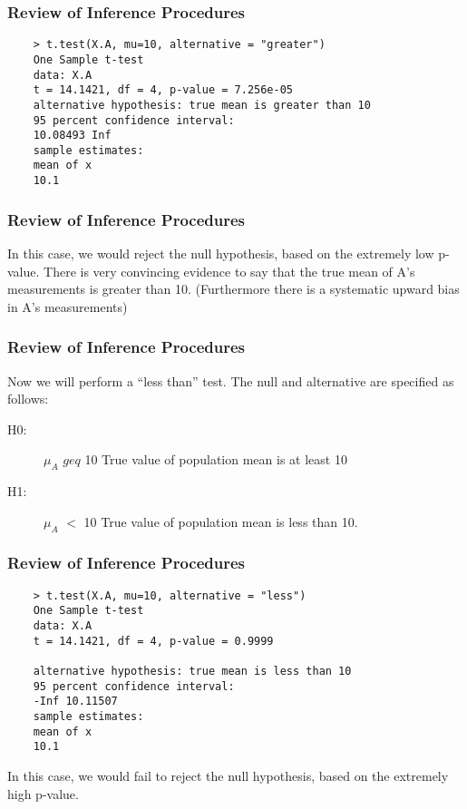 \documentclass{beamer}
\begin{document}
\begin{frame}[fragile]
	\frametitle{Review of Inference Procedures}
	\large
	\begin{verbatim}
	> t.test(X.A, mu=10, alternative = "greater")
	One Sample t-test
	data: X.A
	t = 14.1421, df = 4, p-value = 7.256e-05
	alternative hypothesis: true mean is greater than 10
	95 percent confidence interval:
	10.08493 Inf
	sample estimates:
	mean of x
	10.1
	\end{verbatim}
\end{frame}
\begin{frame}
	\frametitle{Review of Inference Procedures}
	\large
	In this case, we would reject the null hypothesis, based on the
	extremely low p-value. There is very convincing evidence to say
	that the true mean of A’s measurements is greater than 10.
	(Furthermore there is a systematic upward bias in A’s
	measurements)
\end{frame}
\begin{frame}
	\frametitle{Review of Inference Procedures}
	\large
	Now we will perform a “less than” test. The null and alternative are
	specified as follows:
	\begin{description}
		\item[H0:] $\mu_A$ $geq$ 10 True value of population mean is at least 10
		\item[H1:] $\mu_A$ $<$ 10 True value of population mean is less than 10.
	\end{description}
	
\end{frame}
\begin{frame}[fragile]
	\frametitle{Review of Inference Procedures}
	\large
	\begin{verbatim}
	> t.test(X.A, mu=10, alternative = "less")
	One Sample t-test
	data: X.A
	t = 14.1421, df = 4, p-value = 0.9999
	
	alternative hypothesis: true mean is less than 10
	95 percent confidence interval:
	-Inf 10.11507
	sample estimates:
	mean of x
	10.1
	\end{verbatim}
	
	In this case, we would fail to reject the null hypothesis, based on
	the extremely high p-value.
\end{frame}
\end{document}
